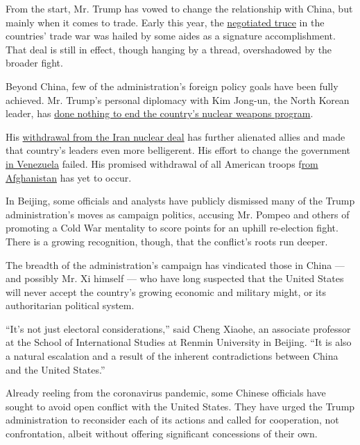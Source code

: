 From the start, Mr. Trump has vowed to change the relationship with
China, but mainly when it comes to trade. Early this year, the
\href{https://www.nytimes.com/2020/01/15/business/economy/china-trade-deal.html}{negotiated
truce} in the countries' trade war was hailed by some aides as a
signature accomplishment. That deal is still in effect, though hanging
by a thread, overshadowed by the broader fight.

Beyond China, few of the administration's foreign policy goals have been
fully achieved. Mr. Trump's personal diplomacy with Kim Jong-un, the
North Korean leader, has
\href{https://www.nytimes.com/2020/06/12/world/asia/korea-nuclear-trump-kim.html?searchResultPosition=5}{done
nothing to end the country's nuclear weapons program}.

His
\href{https://www.nytimes.com/2018/05/08/us/politics/trump-speech-iran-deal.html?searchResultPosition=40}{withdrawal
from the Iran nuclear deal} has further alienated allies and made that
country's leaders even more belligerent. His effort to change the
government
\href{https://www.nytimes.com/2020/03/31/world/americas/coronavirus-venezuela-maduro-guaido.html?searchResultPosition=2}{in
Venezuela} failed. His promised withdrawal of all American troops
f\href{https://www.nytimes.com/2020/05/26/world/asia/afghanistan-troop-withdrawal-election-day.html?searchResultPosition=2}{rom
Afghanistan} has yet to occur.

In Beijing, some officials and analysts have publicly dismissed many of
the Trump administration's moves as campaign politics, accusing Mr.
Pompeo and others of promoting a Cold War mentality to score points for
an uphill re-election fight. There is a growing recognition, though,
that the conflict's roots run deeper.

The breadth of the administration's campaign has vindicated those in
China --- and possibly Mr. Xi himself --- who have long suspected that
the United States will never accept the country's growing economic and
military might, or its authoritarian political system.

``It's not just electoral considerations,'' said Cheng Xiaohe, an
associate professor at the School of International Studies at Renmin
University in Beijing. ``It is also a natural escalation and a result of
the inherent contradictions between China and the United States.''

Already reeling from the coronavirus pandemic, some Chinese officials
have sought to avoid open conflict with the United States. They have
urged the Trump administration to reconsider each of its actions and
called for cooperation, not confrontation, albeit without offering
significant concessions of their own.

